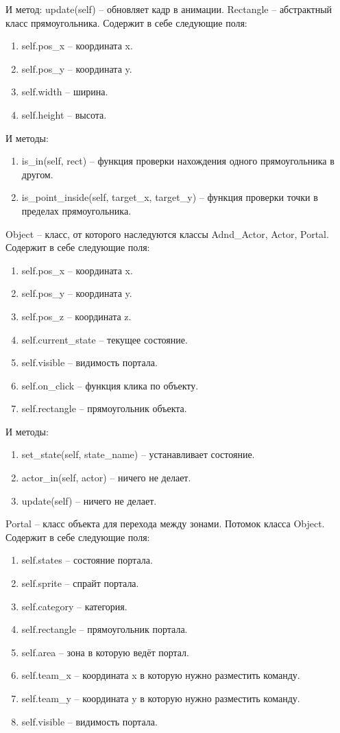 		И метод: update(self) -- обновляет кадр в анимации.
	Rectangle -- абстрактный класс прямоугольника. Содержит в себе следующие поля:
		\begin{enumerate}
			\item self.pos\_x -- координата x.
			\item self.pos\_y -- координата y.
			\item self.width -- ширина.
			\item self.height -- высота.
		\end{enumerate}
		И методы:
		\begin{enumerate}
			\item is\_in(self, rect) -- функция проверки нахождения одного прямоугольника в другом.
			\item is\_point\_inside(self, target\_x, target\_y) -- функция проверки точки в пределах прямоугольника.
		\end{enumerate}
	Object -- класс, от которого наследуются классы Adnd\_Actor, Actor, Portal. Содержит в себе следующие поля:
		\begin{enumerate}
			\item self.pos\_x -- координата x.
			\item self.pos\_y -- координата y.
			\item self.pos\_z -- координата z.
			\item self.current\_state -- текущее состояние.
			\item self.visible -- видимость портала.
			\item self.on\_click -- функция клика по объекту.
			\item self.rectangle -- прямоугольник объекта.
		\end{enumerate}
		И методы:
		\begin{enumerate}
			\item set\_state(self, state\_name) -- устанавливает состояние.
			\item actor\_in(self, actor) -- ничего не делает.
			\item update(self) -- ничего не делает.
		\end{enumerate}
	Portal -- класс объекта для перехода между зонами. Потомок класса Object. Содержит в себе следующие поля:
		\begin{enumerate}
			\item self.states -- состояние портала.
			\item self.sprite -- спрайт портала.
			\item self.category -- категория.
			\item self.rectangle -- прямоугольник портала.
			\item self.area -- зона в которую ведёт портал.
			\item self.team\_x -- координата x в  которую нужно разместить команду.
			\item self.team\_y -- координата y в  которую нужно разместить команду.
			\item self.visible -- видимость портала.
		\end{enumerate}
